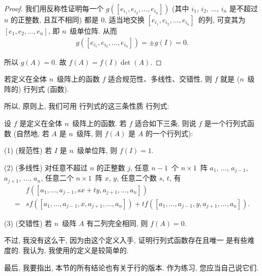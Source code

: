 \documentclass[%
    UTF8,%
    fontset=none,%
    punct=kaiming,%
    zihao=-4,%
    a4paper,%
    oneside,%
]{ctexbook}
\let\emph\relax
\begin{document}
\begin{proof}
    我们用反称性证明每一个
    \(g([e_{i_1}, e_{i_2}, \dots, e_{i_n}])\)
    (其中 \(i_1\), \(i_2\), \(\dots\), \(i_n\)
    是不超过 \(n\) 的正整数, 且互不相同)
    都是 \(0\).
    适当地交换
    \([e_{i_1}, e_{i_2}, \dots, e_{i_n}]\)~的列,
    可变其为 \([e_1, e_2, \dots, e_n]\),
    即 \(n\)~级单位阵.
    从而
    \begin{align*}
        g([e_{i_1}, e_{i_2}, \dots, e_{i_n}])
        = \pm g(I) = 0.
    \end{align*}

    所以 \(g(A) = 0\).
    故 \(f(A) = f(I) \det {(A)}\).
\end{proof}

\begin{theorem}
    若定义在全体 \(n\)~级阵上的函数 \(f\)
    适合规范性、多线性、交错性,
    则 \(f\) 就是 (\(n\)~级阵的) 行列式 (函数).
\end{theorem}

所以, 原则上, 我们可用%
行列式的这三条性质%
\emph{定义}行列式:

\begin{definition}
    设 \(f\) 是定义在全体 \(n\)~级阵上的函数.
    若 \(f\) 适合如下三条, 则说
    \(f\) 是一个行列式函数
    (自然地, 若 \(A\) 是 \(n\)~级阵,
    则 \(f(A)\) 是 \(A\) 的一个行列式):

    (1)
    (规范性)
    若 \(I\) 是 \(n\)~级单位阵,
    则 \(f(I) = 1\).

    (2)
    (多线性)
    对任意不超过 \(n\) 的正整数 \(j\),
    任意 \(n-1\)~个 \(n \times 1\)~阵
    \(a_1\), \(\dots\), \(a_{j-1}\),
    \(a_{j+1}\), \(\dots\), \(a_n\),
    任意二个 \(n \times 1\)~阵 \(x\), \(y\),
    任意二个数 \(s\), \(t\),
    有
    \begin{align*}
             & f
            {([a_1, \dots, a_{j-1}, sx + ty,
                        a_{j+1}, \dots, a_n])}
        \\
        = {} &
        s
        f {([a_1, \dots, a_{j-1}, x, a_{j+1}, \dots, a_n])}
        +
        t
        f {([a_1, \dots, a_{j-1}, y, a_{j+1}, \dots, a_n])}.
    \end{align*}

    (3)
    (交错性)
    若 \(n\)~级阵 \(A\) 有二列完全相同,
    则 \(f {(A)} = 0\).
\end{definition}

不过, 我没有这么干,
因为由这个定义入手,
证明行列式函数存在且唯一%
是有些难度的.
我认为, 我使用的定义是较简单的.

最后, 我要指出,
本节的所有结论也有关于行的版本.
作为练习, 您应当自己说它们.
\end{document}
